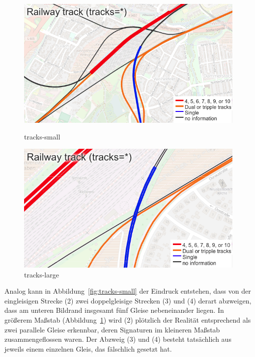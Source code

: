 \documentclass[../main/thesis.tex]{subfiles}
\begin{document}
\begin{figure}[ht]
  \begin{minipage}[t]{.5\linewidth}
    \centering
    \includegraphics[width=\ScaleIfNeeded]{../chapter2/tracks-small}
    \caption{tracks-small}\label{fig:tracks-small}
  \end{minipage}%
  \begin{minipage}[t]{.5\linewidth}
    \centering
    \includegraphics[width=\ScaleIfNeeded]{../chapter2/tracks-large}
    \caption{tracks-large}\label{fig:tracks-large}
  \end{minipage}
\end{figure}

Analog kann in Abbildung~\ref{fig:tracks-small} der Eindruck entstehen, dass von der eingleisigen Strecke (2) zwei doppelgleisige Strecken (3) und (4) derart abzweigen, dass am unteren Bildrand insgesamt fünf Gleise nebeneinander liegen.
In größerem Maßstab (Abbildung~\ref{fig:tracks-large}) wird (2) plötzlich der Realität entsprechend als zwei parallele Gleise erkennbar, deren Signaturen im kleineren Maßstab zusammengeflossen waren.
Der Abzweig (3) und (4) besteht tatsächlich aus jeweils einem einzelnen Gleis, das fälschlich  gesetzt hat.
\end{document}
